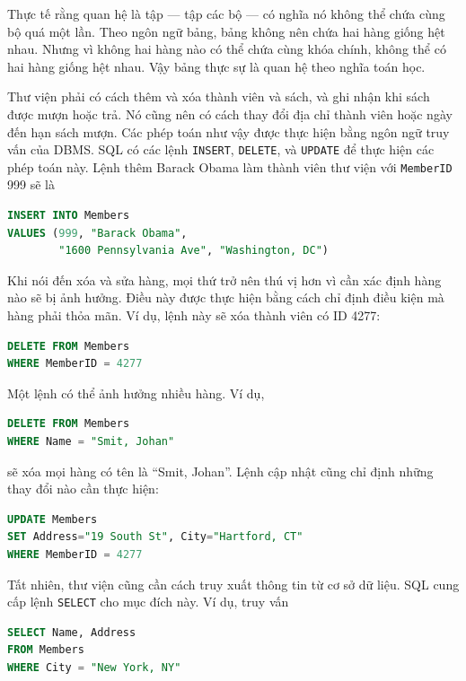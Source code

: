 Thực tế rằng quan hệ là tập --- tập các bộ --- có nghĩa nó không thể chứa cùng bộ quá một lần. Theo ngôn ngữ bảng, bảng không nên chứa hai hàng giống hệt nhau. Nhưng vì không hai hàng nào có thể chứa cùng khóa chính, không thể có hai hàng giống hệt nhau. Vậy bảng thực sự là quan hệ theo nghĩa toán học.

Thư viện phải có cách thêm và xóa thành viên và sách, và ghi nhận khi sách được mượn hoặc trả. Nó cũng nên có cách thay đổi địa chỉ thành viên hoặc ngày đến hạn sách mượn. Các phép toán như vậy được thực hiện bằng ngôn ngữ truy vấn của DBMS. SQL có các lệnh \texttt{INSERT}, \texttt{DELETE}, và \texttt{UPDATE} để thực hiện các phép toán này. Lệnh thêm Barack Obama làm thành viên thư viện với \texttt{MemberID} 999 sẽ là

\begin{lstlisting}[language=SQL]
INSERT INTO Members
VALUES (999, "Barack Obama",
        "1600 Pennsylvania Ave", "Washington, DC")
\end{lstlisting}

Khi nói đến xóa và sửa hàng, mọi thứ trở nên thú vị hơn vì cần xác định hàng nào sẽ bị ảnh hưởng. Điều này được thực hiện bằng cách chỉ định điều kiện mà hàng phải thỏa mãn. Ví dụ, lệnh này sẽ xóa thành viên có ID 4277:

\begin{lstlisting}[language=SQL]
DELETE FROM Members
WHERE MemberID = 4277
\end{lstlisting}

Một lệnh có thể ảnh hưởng nhiều hàng. Ví dụ,

\begin{lstlisting}[language=SQL]
DELETE FROM Members
WHERE Name = "Smit, Johan"
\end{lstlisting}

sẽ xóa mọi hàng có tên là ``Smit, Johan''. Lệnh cập nhật cũng chỉ định những thay đổi nào cần thực hiện:

\begin{lstlisting}[language=SQL]
UPDATE Members
SET Address="19 South St", City="Hartford, CT"
WHERE MemberID = 4277
\end{lstlisting}

Tất nhiên, thư viện cũng cần cách truy xuất thông tin từ cơ sở dữ liệu. SQL cung cấp lệnh \texttt{SELECT} cho mục đích này. Ví dụ, truy vấn

\begin{lstlisting}[language=SQL]
SELECT Name, Address
FROM Members
WHERE City = "New York, NY"
\end{lstlisting}


